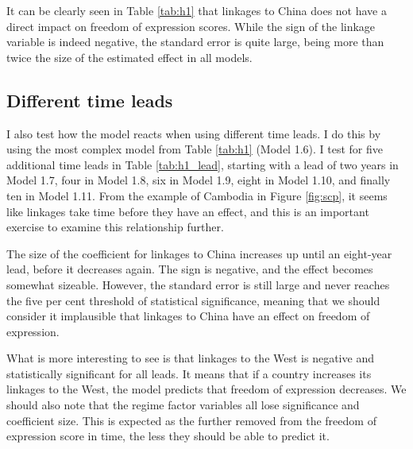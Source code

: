 It can be clearly seen in Table \ref{tab:h1} that linkages to China does not have a direct impact on freedom of expression scores. While the sign of the linkage variable is indeed negative, the standard error is quite large, being more than twice the size of the estimated effect in all models.

\subsection{Different time leads}
I also test how the model reacts when using different time leads. I do this by using the most complex model from Table \ref{tab:h1} (Model 1.6). I test for five additional time leads in Table \ref{tab:h1_lead}, starting with a lead of two years in Model 1.7, four in Model 1.8, six in Model 1.9, eight in Model 1.10, and finally ten in Model 1.11. From the example of Cambodia in Figure \ref{fig:scp}, it seems like linkages take time before they have an effect, and this is an important exercise to examine this relationship further.

The size of the coefficient for linkages to China increases up until an eight-year lead, before it decreases again. The sign is negative, and the effect becomes somewhat sizeable. However, the standard error is still large and never reaches the five per cent threshold of statistical significance, meaning that we should consider it implausible that linkages to China have an effect on freedom of expression. 

What is more interesting to see is that linkages to the West is negative and statistically significant for all leads. It means that if a country increases its linkages to the West, the model predicts that freedom of expression decreases. We should also note that the regime factor variables all lose significance and coefficient size. This is expected as the further removed from the freedom of expression score in time, the less they should be able to predict it. 

